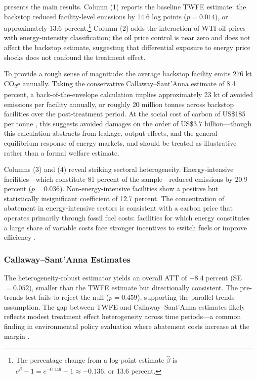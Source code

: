 \documentclass[12pt]{article}
\begin{document}
 presents the main results. Column (1) reports the baseline TWFE estimate: the backstop reduced facility-level emissions by 14.6 log points ($p = 0.014$), or approximately 13.6 percent.\footnote{The percentage change from a log-point estimate $\hat{\beta}$ is $e^{\hat{\beta}} - 1 = e^{-0.146} - 1 \approx -0.136$, or 13.6 percent.} Column (2) adds the interaction of WTI oil prices with energy-intensity classification; the oil price control is near zero and does not affect the backstop estimate, suggesting that differential exposure to energy price shocks does not confound the treatment effect.

To provide a rough sense of magnitude: the average backstop facility emits 276 kt CO\textsubscript{2}e annually. Taking the conservative Callaway--Sant'Anna estimate of 8.4 percent, a back-of-the-envelope calculation implies approximately 23 kt of avoided emissions per facility annually, or roughly 20 million tonnes across backstop facilities over the post-treatment period. At the social cost of carbon of US\$185 per tonne \citep{Rennert2022}, this suggests avoided damages on the order of US\$3.7 billion---though this calculation abstracts from leakage, output effects, and the general equilibrium response of energy markets, and should be treated as illustrative rather than a formal welfare estimate.

Columns (3) and (4) reveal striking sectoral heterogeneity. Energy-intensive facilities---which constitute 81 percent of the sample---reduced emissions by 20.9 percent ($p = 0.036$). Non-energy-intensive facilities show a positive but statistically insignificant coefficient of 12.7 percent. The concentration of abatement in energy-intensive sectors is consistent with a carbon price that operates primarily through fossil fuel costs: facilities for which energy constitutes a large share of variable costs face stronger incentives to switch fuels or improve efficiency \citep{Goulder2013}.

\subsubsection*{Callaway--Sant'Anna Estimates} The heterogeneity-robust \citet{Callaway2021} estimator yields an overall ATT of $-$8.4 percent (SE $= 0.052$), smaller than the TWFE estimate but directionally consistent. The pre-trends test fails to reject the null ($p = 0.459$), supporting the parallel trends assumption. The gap between TWFE and Callaway--Sant'Anna estimates likely reflects modest treatment effect heterogeneity across time periods---a common finding in environmental policy evaluation where abatement costs increase at the margin \citep{Fowlie2012}.
\end{document}
